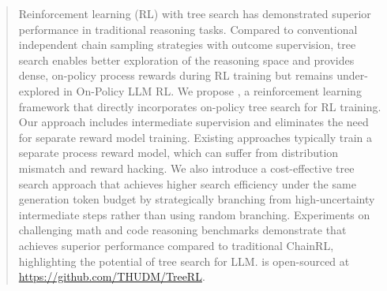 \begin{abstract}
 Reinforcement learning (RL) with tree search has demonstrated superior performance in traditional reasoning tasks. Compared to conventional independent chain sampling strategies with outcome supervision, tree search enables better exploration of the reasoning space and provides dense, on-policy process rewards during RL training but remains under-explored in On-Policy LLM RL.
 We propose \model, a reinforcement learning framework that directly incorporates on-policy tree search for RL training. Our approach includes intermediate supervision and eliminates the need for separate reward model training. Existing approaches typically train a separate process reward model, which can suffer from distribution mismatch and reward hacking. 
 We also introduce a cost-effective tree search approach that achieves higher search efficiency under the same generation token budget by strategically branching from high-uncertainty intermediate steps rather than using random branching. 
 Experiments on challenging math and code reasoning benchmarks demonstrate that \model achieves superior performance compared to traditional ChainRL, highlighting the potential of tree search for LLM. 
 \model is open-sourced at \url{https://github.com/THUDM/TreeRL}. 


\end{abstract}
